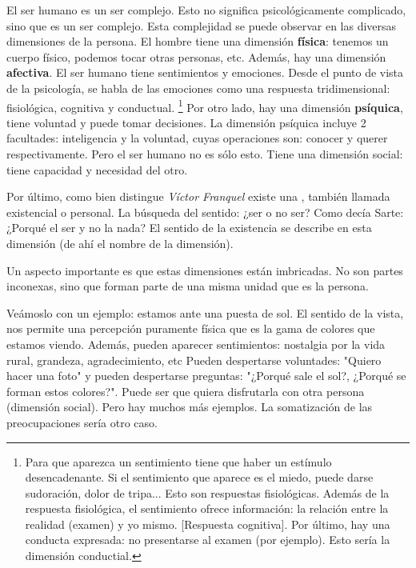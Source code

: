 \documentclass[palatino]{apuntesURJC}
\begin{document}
El ser humano es un ser complejo. 
%
Esto no significa psicológicamente complicado, sino que es un ser complejo.
%
Esta complejidad se puede observar en las diversas dimensiones de la persona.
%
El hombre tiene una dimensión \textbf{física}: tenemos un cuerpo físico, podemos tocar otras personas, etc. Además, hay una dimensión \textbf{afectiva}.  
%
El ser humano tiene sentimientos y emociones.
%
Desde el punto de vista de la psicología, se habla de las emociones como una respuesta tridimensional:  fisiológica, cognitiva y conductual.
%
\footnote{Para que aparezca un sentimiento tiene que haber un estímulo desencadenante.
%
Si el sentimiento que aparece es el miedo, puede darse sudoración, dolor de tripa... Esto son respuestas fisiológicas.
%
Además de la respuesta fisiológica, el sentimiento ofrece información: la relación entre la realidad (examen) y yo mismo. [Respuesta cognitiva].
%
Por último, hay una conducta expresada: no presentarse al examen (por ejemplo).
%
Esto sería la dimensión conductial.}
%
Por otro lado, hay una dimensión \textbf{psíquica}, tiene voluntad y puede tomar decisiones.
%
La dimensión psíquica incluye 2 facultades: inteligencia y la voluntad, cuyas operaciones son: conocer y querer respectivamente.
%
Pero el ser humano no es sólo esto.
%
Tiene una dimensión social: tiene capacidad y necesidad del otro.

Por último, como bien distingue \textit{Víctor Franquel} existe una , también llamada existencial o personal.
%
La búsqueda del sentido: ¿ser o no ser? Como decía Sarte: ¿Porqué el ser y no la nada?
%
El sentido de la existencia se describe en esta dimensión (de ahí el nombre de la dimensión).

Un aspecto importante es que estas dimensiones están imbricadas. 
%
No son partes inconexas, sino que forman parte de una misma unidad que es la persona. 

Veámoslo con un ejemplo: estamos ante una puesta de sol. 
%
El sentido de la vista, nos permite una percepción puramente física que es la gama de colores que estamos viendo.
%
Además, pueden aparecer sentimientos: nostalgia por la vida rural, grandeza, agradecimiento, etc
%
Pueden despertarse voluntades: "Quiero hacer una foto" y pueden despertarse preguntas: "¿Porqué sale el sol?, ¿Porqué se forman estos colores?".
%
Puede ser que quiera disfrutarla con otra persona (dimensión social). 
%
Pero hay muchos más ejemplos. 
%
La somatización de las preocupaciones sería otro caso.
\end{document}
